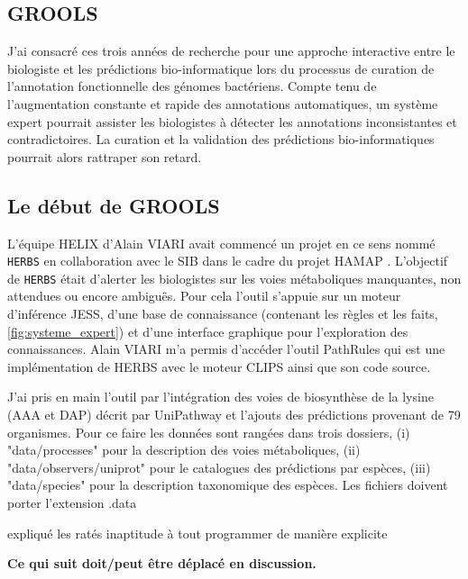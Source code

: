 \begin{refsegment}
\chapter{GROOLS}

J'ai consacré ces trois années de recherche pour une approche interactive entre le biologiste et les prédictions bio-informatique lors du processus de curation de l'annotation fonctionnelle des génomes bactériens. Compte tenu de l'augmentation constante et rapide des annotations automatiques, un système expert pourrait assister les biologistes à détecter les annotations inconsistantes et contradictoires. La curation et la validation des prédictions bio-informatiques pourrait alors rattraper son retard.

\section{Le début de GROOLS}

L'équipe HELIX d'Alain VIARI avait commencé un projet en ce sens nommé \texttt{\gls{HERBS}} en collaboration avec le \gls{SIB} dans le cadre du projet \gls{HAMAP} \cite{pedruzzi2015hamap}. L'objectif de \texttt{\gls{HERBS}} était d'alerter les biologistes sur les voies métaboliques manquantes, non attendues ou encore ambiguës. Pour cela l'outil s'appuie sur un moteur d'inférence \gls{JESS}, d'une base de connaissance (contenant les règles et les faits, \cref{fig:systeme_expert}) et d'une interface graphique pour l'exploration des connaissances. Alain VIARI m'a permis d'accéder l'outil PathRules qui est une implémentation de \gls{HERBS} avec le moteur \gls{CLIPS} \cite{riley1991clips} ainsi que son code source.


J'ai pris en main l'outil par l'intégration des voies de biosynthèse de la lysine (AAA et DAP) décrit par UniPathway et l'ajouts des prédictions provenant de 79 organismes. Pour ce faire les données sont rangées dans trois dossiers, (i) "data/processes" pour la description des voies métaboliques, (ii) "data/observers/uniprot" pour le catalogues des prédictions par espèces, (iii) "data/species" pour la description taxonomique des espèces. Les fichiers doivent porter l'extension .data




expliqué les ratés
inaptitude à tout programmer de manière explicite

\textbf{Ce qui suit doit/peut être déplacé en discussion.}


\end{refsegment}
